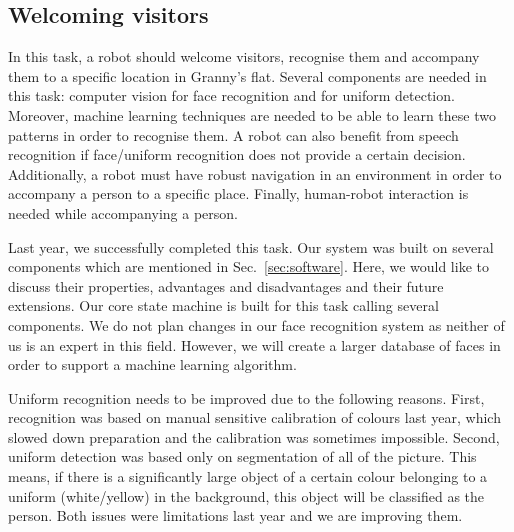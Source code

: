 
\subsection{Welcoming visitors}

In this task, a robot should welcome visitors, recognise them and accompany them to a specific location in Granny's flat. Several components are needed in this task: computer vision for face recognition and for uniform detection. Moreover, machine learning techniques are needed to be able to learn these two patterns in order to recognise them. A robot can also benefit from speech recognition if face/uniform recognition does not provide a certain decision. Additionally, a robot must have robust navigation in an environment in order to accompany a person to a specific place. 
Finally, human-robot interaction is needed while accompanying a person.

Last year, we successfully completed this task. Our system was built on several components which are mentioned in Sec.~\ref{sec:software}. 
Here, we would like to discuss their properties, advantages and disadvantages and their future extensions. 
Our core state machine is built for this task calling several components. 
We do not plan changes in our face recognition system as neither of us is an expert in this field. 
However, we will create a larger database of faces in order to support a machine learning algorithm.

Uniform recognition needs to be improved due to the following reasons.
First, recognition was based on manual sensitive calibration of colours last year, which slowed down preparation and the calibration was sometimes impossible. 
Second, uniform detection was based only on segmentation of all of the picture. This means, if there is a significantly large object of a certain colour belonging to a uniform (white/yellow) in the background, this object will be classified as the person. 
Both issues were limitations last year and we are improving them.  

